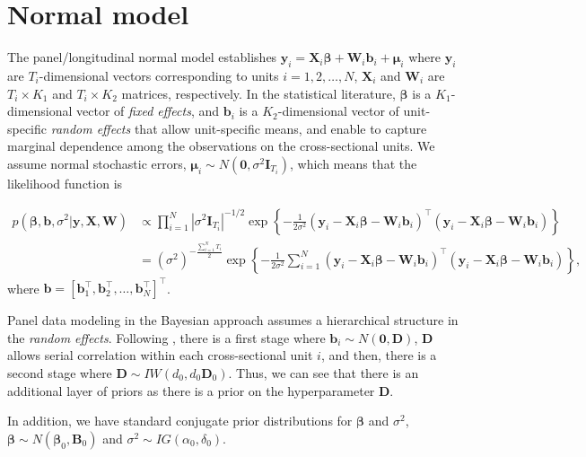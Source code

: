 \section{Normal model}\label{sec91}

The panel/longitudinal normal model establishes $\bm{y}_i=\bm{X}_i\bm{\beta}+\bm{W}_i\bm{b}_i+\bm{\mu}_i$ where $\bm{y}_i$ are $T_i$-dimensional vectors corresponding to units $i=1,2,\dots,N$, $\bm{X}_i$ and $\bm{W}_i$ are $T_i\times K_1$ and $T_i\times K_2$ matrices, respectively. In the statistical literature, $\bm{\beta}$ is a $K_1$-dimensional vector of \textit{fixed effects}, and $\bm{b}_i$ is a $K_2$-dimensional vector of unit-specific \textit{random effects} that allow unit-specific means, and enable to capture marginal dependence among the observations on the cross-sectional units. We assume normal stochastic errors, $\bm{\mu}_i\sim{N}(\bm{0},\sigma^2\bm{I}_{T_i})$, which means that the likelihood function is

{\footnotesize
\begin{align*}
	p(\bm{\beta},\bm{b},\sigma^2|\bm{y}, \bm{X},\bm{W}) & \propto \prod_{i=1}^N |\sigma^2\bm{I}_{T_i}|^{-1/2}\exp\left\{-\frac{1}{2\sigma^2}(\bm{y}_i-\bm{X}_i\bm{\beta}-\bm{W}_i\bm{b}_i)^{\top}(\bm{y}_i-\bm{X}_i\bm{\beta}-\bm{W}_i\bm{b}_i)\right\}\\
	& = (\sigma^2)^{-\frac{\sum_{i=1}^N T_i}{2}}\exp\left\{-\frac{1}{2\sigma^2}\sum_{i=1}^N(\bm{y}_i-\bm{X}_i\bm{\beta}-\bm{W}_i\bm{b}_i)^{\top}(\bm{y}_i-\bm{X}_i\bm{\beta}-\bm{W}_i\bm{b}_i)\right\},
\end{align*} 
}
where $\bm{b}=[\bm{b}_1^{\top}, \bm{b}_2^{\top},\dots, \bm{b}_N^{\top}]^{\top}$.

Panel data modeling in the Bayesian approach assumes a hierarchical structure in the \textit{random effects}. Following \cite{Chib1999}, there is a first stage where $\bm{b}_i\sim{N}(\bm{0},\bm{D})$, $\bm{D}$ allows serial correlation within each cross-sectional unit $i$, and then, there is a second stage where $\bm{D}\sim{I}{W}(d_0,d_0\bm{D}_0)$. Thus, we can see that there is an additional layer of priors as there is a prior on the hyperparameter $\bm{D}$. 

In addition, we have standard conjugate prior distributions for $\bm{\beta}$ and $\sigma^2$, $\bm{\beta} \sim {N}(\bm{\beta}_0,\bm{B}_0)$ and 
$\sigma^2 \sim {I}{G}(\alpha_0, \delta_0)$. 

